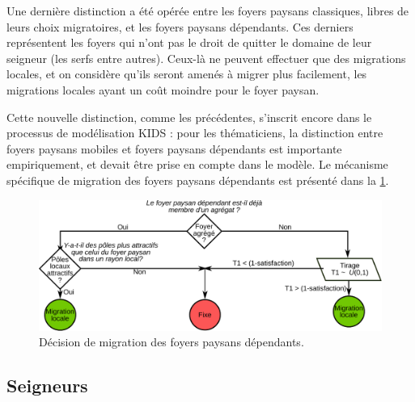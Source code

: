 Une dernière distinction a été opérée entre les foyers paysans classiques, libres de leurs choix migratoires, et les foyers paysans \og dépendants\fg{}.
Ces derniers représentent les foyers qui n'ont pas le droit de quitter le domaine de leur seigneur (les serfs entre autres).
Ceux-là ne peuvent effectuer que des migrations locales, et on considère qu'ils seront amenés à migrer plus facilement, les migrations locales ayant un \og coût\fg{} moindre pour le foyer paysan.

Cette nouvelle distinction, comme les précédentes, s'inscrit encore dans le processus de modélisation KIDS : pour les thématiciens, la distinction entre foyers paysans \og mobiles\fg{} et foyers paysans \og dépendants\fg{} est importante empiriquement, et devait être prise en compte dans le modèle.
Le mécanisme spécifique de migration des foyers paysans dépendants est présenté dans la \cref{fig:choix-migration-dependants}.


\begin{figure}[H]
	\centering
	\includegraphics[width=0.9\linewidth]{img/choix_migration_dependants.pdf}
	\caption{Décision de migration des foyers paysans dépendants.}
	\label{fig:choix-migration-dependants}
\end{figure}
 

\subsection{Seigneurs}
